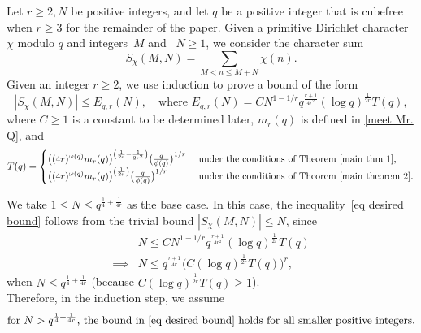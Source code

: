 \documentclass[12pt]{amsart}
\theoremstyle{plain}
\theoremstyle{definition}
\begin{document}
Let $r\ge 2, N$ be positive integers, and let $q$ be a positive integer that is cubefree when $r\ge 3$ for the remainder of the paper.
Given a primitive Dirichlet character $\chi$ modulo $q$ and integers~$M$ and ~$N\ge1$, we consider the character sum
\begin{equation*}
    S_\chi\left(M, N\right)=\sum_{M<n \le M+N}\chi(n).
\end{equation*}
Given an integer $r\ge2$, we use induction to prove a bound of the form
\begin{equation} \label{eq desired bound}
| S_\chi(M,N) | \le E_{q,r}(N), \quad\text{where }
E_{q,r}(N) = C N^{1-1/r} q^{\frac{r+1}{4r^2}} (\log q)^{\frac{1}{2r}} T(q),
\end{equation}
where $C\ge 1$ is a constant to be determined later, $m_r(q)$ is defined in \eqref{meet Mr. Q}, and
\begin{equation}\label{meet T(q)}
T(q) = \begin{cases}\bigl((4r)^{\omega(q)} m_r(q)\bigr)^{\left({\frac{1}{2r}-\frac{1}{2r^2}}\right)} \bigl( \frac q{\phi(q)} \bigr)^{1/r}& \text{ under the conditions of Theorem } \ref{main thm 1},\\
\bigl((4r)^{\omega(q)} m_r(q)\bigr)^{\left({\frac{1}{2r}}\right)} \bigl( \frac q{\phi(q)} \bigr)^{1/r}& \text{ under the conditions of Theorem } \ref{main theorem 2} 
.\end{cases}
\end{equation}

We take $1\le N\le q^{\frac{1}{4}+\frac{1}{4r}}$ as the base case. In this case, the inequality~\eqref{eq desired bound} follows from the trivial bound $|S_\chi(M,N)| \le N$, since
\begin{align*}
&N \le C N^{1-1/r} q^{\frac{r+1}{4r^2}} (\log q)^{\frac{1}{2r}} T(q) \\
\implies &N \le q^{\frac{r+1}{4r}} \bigl( C (\log q)^{\frac{1}{2r}} T(q) \bigr)^r,
\end{align*}
when $N \le q^{\frac{1}{4}+\frac{1}{4r}}$ (because $C(\log q)^{\frac{1}{2r}} T(q) \ge 1$).
\\
Therefore, in the induction step, we assume
\begin{align}\label{inductive hypothesis}
\text{for $N > q^{\frac{1}{4}+\frac{1}{4r}}$, the bound in \eqref{eq desired bound} holds for all smaller positive integers.}
\end{align}
\end{document}
